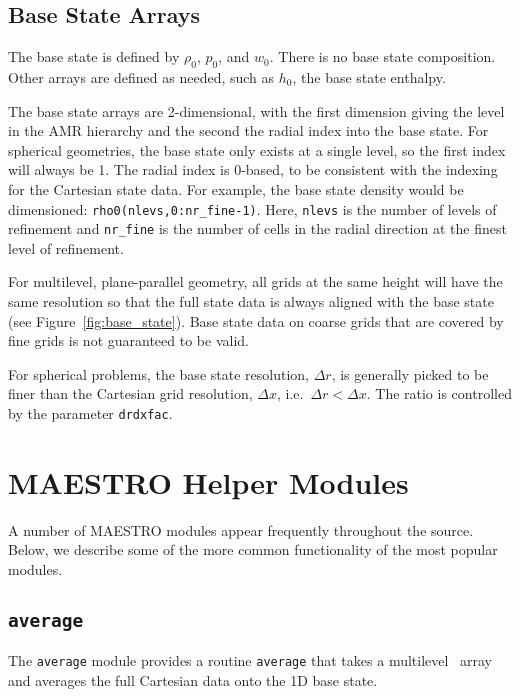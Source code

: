 \subsection{Base State Arrays}

The base state is defined by $\rho_0$, $p_0$, and $w_0$.  There is no
base state composition.  Other arrays are defined as needed, such as
$h_0$, the base state enthalpy.

The base state arrays are 2-dimensional, with the first dimension
giving the level in the AMR hierarchy and the second the radial index
into the base state.  For spherical geometries, the base state only
exists at a single level, so the first index will always be 1.  The
radial index is 0-based, to be consistent with the indexing for the
Cartesian state data.  For example, the base state density would be
dimensioned: {\tt rho0(nlevs,0:nr\_fine-1)}.  Here, {\tt nlevs} is the
number of levels of refinement and {\tt nr\_fine} is the number of
cells in the radial direction at the finest level of refinement.

For multilevel, plane-parallel geometry, all grids at the same height
will have the same resolution so that the full state data is always
aligned with the base state (see Figure~\ref{fig:base_state}).  Base
state data on coarse grids that are covered by fine grids is not
guaranteed to be valid.

For spherical problems, the base state resolution, $\Delta r$, is
generally picked to be finer than the Cartesian grid resolution,
$\Delta x$, i.e.\ $\Delta r < \Delta x$.  The ratio is controlled
by the parameter {\tt drdxfac}.



\section{MAESTRO Helper Modules}

A number of MAESTRO modules appear frequently throughout the source.
Below, we describe some of the more common functionality of the most
popular modules.

\subsection{\tt average}

The {\tt average} module provides a routine {\tt average} that takes
a multilevel \multifab\ array and averages the full Cartesian data
onto the 1D base state.

